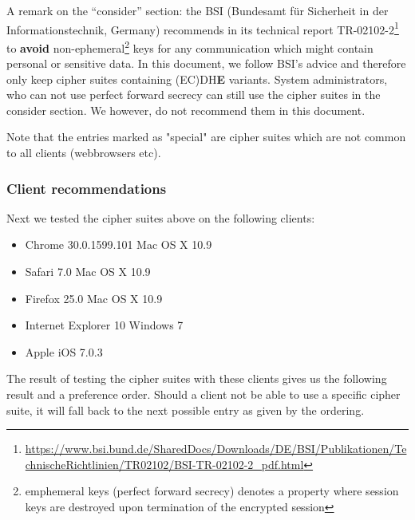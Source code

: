 A remark on the ``consider'' section: the BSI (Bundesamt f\"ur Sicherheit in der Informationstechnik, Germany) recommends in its technical report TR-02102-2\footnote{\url{https://www.bsi.bund.de/SharedDocs/Downloads/DE/BSI/Publikationen/TechnischeRichtlinien/TR02102/BSI-TR-02102-2_pdf.html}} to \textbf{avoid} non-ephemeral\footnote{emphemeral keys (perfect forward secrecy) denotes a property where session keys are destroyed upon termination of the encrypted session} keys for any communication which might contain personal or sensitive data. In this document, we follow BSI's advice and therefore only keep cipher suites containing (EC)DH\textbf{E} variants. System administrators, who can not use perfect forward secrecy can still use the cipher suites in the consider section. We however, do not recommend them in this document.

Note that the entries marked as "special" are cipher suites which are not common to all clients (webbrowsers etc).


\subsubsection{Client recommendations}
 
Next we tested the cipher suites above on the following clients:

\begin{itemize}
\item Chrome 30.0.1599.101 Mac OS X 10.9
\item Safari 7.0 Mac OS X 10.9
\item Firefox 25.0 Mac OS X 10.9
\item Internet Explorer 10 Windows 7
\item Apple iOS 7.0.3
\end{itemize}


The result of testing the cipher suites with these clients gives us the following result and a preference order. 
Should a client not be able to use a specific cipher suite, it will fall back to the next possible entry as given by the ordering.

